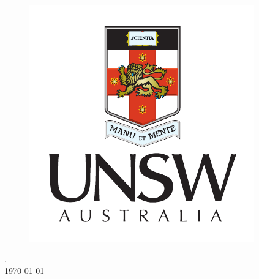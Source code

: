 \begin{titlepage}
\begin{center}
\begin{figure}[htbp]
\centering
\href{http://www.unsw.edu.au/}{\includegraphics{Figures/UNSW-Portrait-Colour-Pos.pdf}}
\end{figure}

\deptname , \facname\\[0.7cm] %
 
{\large \today}\\[0cm] %
 
\vfill
{} %
\end{center}

\end{titlepage}